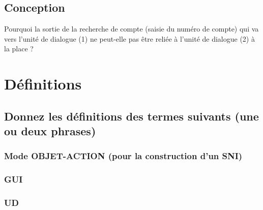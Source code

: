 \documentclass[12pt]{article}
\begin{document}
\begin{center}
\fbox{
  \begin{minipage}{6in}
    \hfill\vspace{7in}
  \end{minipage}
}
\end{center}

\subsection{Conception}

Pourquoi la sortie de la recherche de compte (saisie du numéro de compte) qui va vers l'unité de dialogue (1)
ne peut-elle pas être reliée à l'unité de dialogue (2) à la place ?

\begin{center}
\fbox{
  \begin{minipage}{6in}
    \hfill\vspace{2.5in}
  \end{minipage}
}
\end{center}

\section{Définitions}

\subsection*{Donnez les définitions des termes suivants (une ou deux phrases)}

\subsubsection*{Mode OBJET-ACTION (pour la construction d'un SNI)}

\fbox{ \begin{minipage}{6in} \hfill\vspace{1.5in} \end{minipage} }

\subsubsection*{GUI}

\fbox{ \begin{minipage}{6in} \hfill\vspace{1.5in} \end{minipage} }

\subsubsection*{UD}
\end{document}
